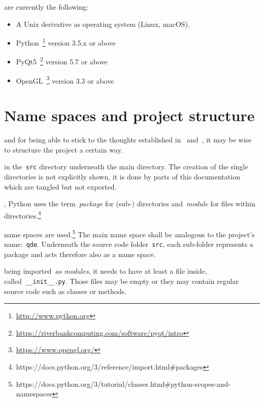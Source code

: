 \documentclass[%
    a4paper,    %
    justified,  %
    nobib,      %
    openany     %
]{tufte-book}
\begin{document}
 are currently the
following:

\begin{itemize}
  \item A Unix derivative as operating system (Linux, macOS).
  \item Python~\footnote{\url{http://www.python.org}} version 3.5.x or above
  \item PyQt5~\footnote{%
      \url{https://riverbankcomputing.com/software/pyqt/intro}} version 5.7 or
    above
  \item OpenGL~\footnote{\url{https://www.opengl.org/}} version 3.3 or above
\end{itemize}%

\section{Name spaces and project structure}
\label{appendix:sec:name-spaces}

 and for being able to
stick to the thoughts established in~
and~, it may be wise to structure the project a
certain way.

 in the~\verb+src+ directory
underneath the main directory. The creation of the single directories is not
explicitly shown, it is done by parts of this documentation which are tangled
but not exported.

, Python uses the
term~\emph{package} for (sub-) directories and~\emph{module} for files within
directories.\footnote{https://docs.python.org/3/reference/import.html\#packages}

 name
spaces are
used.\footnote{https://docs.python.org/3/tutorial/classes.html\#python-scopes-and-namespaces}
The main name space shall be analogous to the project's name:~\verb+qde+.
Underneath the source code folder~\verb+src+, each sub-folder represents a
package and acts therefore also as a name space.

 being
imported~\emph{as modules}, it needs to have at least a file inside,
called~\verb+__init__.py+. Those files may be empty or they may contain
regular source code such as classes or methods.
\end{document}
